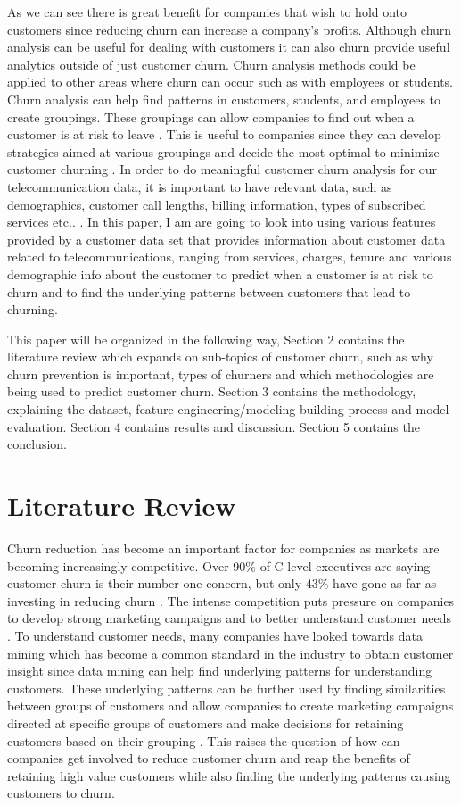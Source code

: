 \documentclass[12pt, a4paper]{article}
\begin{document}
As we can see there is great benefit for companies that wish to hold onto customers since reducing churn can increase a company's profits. Although churn analysis can be useful for dealing with customers it can also churn provide useful analytics outside of just customer churn. Churn analysis methods could be applied to other areas where churn can occur such as with employees or students. Churn analysis can help find patterns in customers, students, and employees to create groupings. These groupings can allow companies to find out when a customer is at risk to leave \cite{churn_analysis}. This is useful to companies since they can develop strategies aimed at various groupings and decide the most optimal to minimize customer churning \cite{churn_analysis}. In order to do meaningful customer churn analysis for our telecommunication data, it is important to have relevant data, such as demographics, customer call lengths, billing information, types of subscribed services etc.. \cite{churn1}. In this paper, I am are going to look into using various features provided by a customer data set that provides information about customer data related to telecommunications, ranging from services, charges, tenure and various demographic info about the customer to predict when a customer is at risk to churn and to find the underlying patterns between customers that lead to churning.

This paper will be organized in the following way, Section 2 contains the literature review which expands on sub-topics of customer churn, such as why churn prevention is important, types of churners and which methodologies are being used to predict customer churn. Section 3 contains the methodology, explaining the dataset, feature engineering/modeling building process and model evaluation. Section 4 contains results and discussion. Section 5 contains the conclusion.


\section{Literature Review}
Churn reduction has become an important factor for companies as markets are becoming increasingly competitive. Over 90\% of C-level executives are saying customer churn is their number one concern, but only 43\% have gone as far as investing in reducing churn \cite{ml_techniques_to_predict_churn}. The intense competition puts pressure on companies to develop strong marketing campaigns and to better understand customer needs \cite{customer_retention}. To understand customer needs, many companies have looked towards data mining which has become a common standard in the industry to obtain customer insight since data mining can help find underlying patterns for understanding customers. These underlying patterns can be further used by finding similarities between groups of customers and allow companies to create marketing campaigns directed at specific groups of customers and make decisions for retaining customers based on their grouping \cite{customer_retention}. This raises the question of how can companies get involved to reduce customer churn and reap the benefits of retaining high value customers while also finding the underlying patterns causing customers to churn.\\
\end{document}
